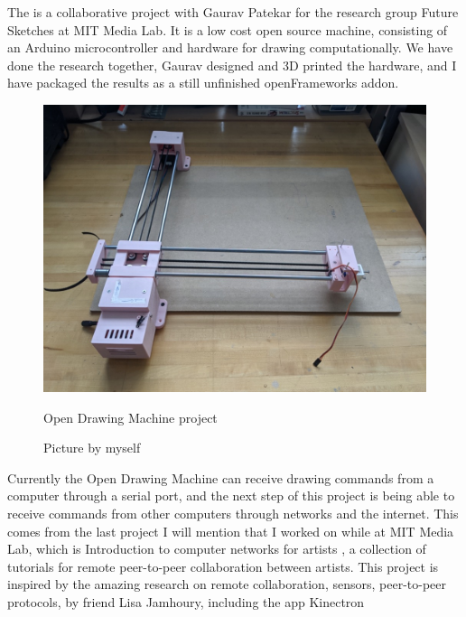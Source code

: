 The \cite[Open Drawing Machine]{website-open-drawing-machine} is a collaborative project with Gaurav Patekar for the research group Future Sketches at MIT Media Lab. It is a low cost open source machine, consisting of an Arduino microcontroller and hardware for drawing computationally. We have done the research together, Gaurav designed and 3D printed the hardware, and I have packaged the results as a still unfinished openFrameworks addon.

\begin{figure}[ht]
  \centering
  \includegraphics[width=0.75\linewidth,height=0.25\textheight,keepaspectratio]{images/open-drawing-machine.jpg}
  \caption{Open Drawing Machine project}
  \caption*{Picture by myself}
  \label{fig:open-drawing-machine}
\end{figure}

Currently the Open Drawing Machine can receive drawing commands from a computer through a serial port, and the next step of this project is being able to receive commands from other computers through networks and the internet. This comes from the last project I will mention that I worked on while at MIT Media Lab, which is Introduction to computer networks for artists \cite{website-intro-to-computer-networks-for-artists}, a collection of tutorials for remote peer-to-peer collaboration between artists. This project is inspired by the amazing research on remote collaboration, sensors, peer-to-peer protocols, by friend Lisa Jamhoury, including the app Kinectron

